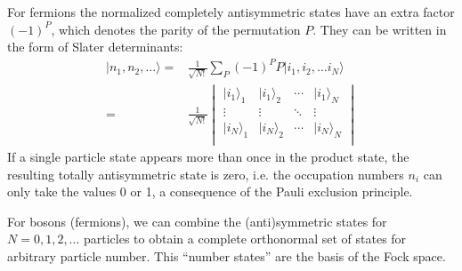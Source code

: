 For fermions the normalized completely antisymmetric states have an extra
factor $(-1)^{P}$, which denotes the parity of the permutation $P$.  They can
be written in the form of Slater determinants: \begin{equation}
\begin{split}
  | n_{1},  n_{2}, \ldots \rangle = &
  \frac{1}{\sqrt{N!}} \sum_{P} (- 1)^{P} P |
                                 i_{1},  i_{2}, \ldots i_{N} \rangle \\
  = &
  \frac{1}{\sqrt{N!}}
  \begin{vmatrix}
  |i_{1}\rangle_{1} & |i_{1}\rangle_{2} & \dotsm & |i_{1}\rangle_{N} \\
  \vdots &  \vdots &  \ddots   & \vdots \\
  |i_{N}\rangle_{1} & |i_{N}\rangle_{2} & \dotsm & |i_{N}\rangle_{N} \\
\end{vmatrix}
\end{split} 
  \label{eq:antisymmetrize} 
\end{equation}  
If a single particle state appears more than once in the product state, the
resulting totally antisymmetric state is zero,  i.e. the occupation numbers
$n_{i}$ can only take the values 0 or 1, a consequence of the Pauli exclusion
principle. 

For bosons (fermions), we can combine the (anti)symmetric states for
$N=0,1,2,\ldots$ particles to obtain a complete orthonormal set of states for
arbitrary particle number.  This ``number states'' are the basis of the Fock
space. 


